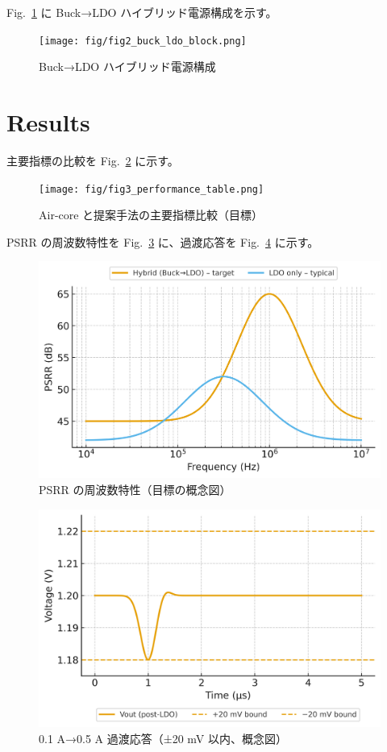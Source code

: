 \documentclass[conference]{IEEEtran}
\begin{document}
Fig.~\ref{fig2} に Buck→LDO ハイブリッド電源構成を示す。

\begin{figure}[htbp]
\centering
\texttt{[image: fig/fig2\_buck\_ldo\_block.png]}
\caption{Buck→LDO ハイブリッド電源構成}
\label{fig2}
\end{figure}

\section{Results}
主要指標の比較を Fig.~\ref{fig3} に示す。

\begin{figure}[htbp]
\centering
\texttt{[image: fig/fig3\_performance\_table.png]}
\caption{Air-core と提案手法の主要指標比較（目標）}
\label{fig3}
\end{figure}

PSRR の周波数特性を Fig.~\ref{fig4} に、過渡応答を Fig.~\ref{fig5} に示す。

\begin{figure}[htbp]
\centering
\includegraphics[width=0.8\linewidth]{fig/fig4_psrr_target.png}
\caption{PSRR の周波数特性（目標の概念図）}
\label{fig4}
\end{figure}

\begin{figure}[htbp]
\centering
\includegraphics[width=0.8\linewidth]{fig/fig5_transient_response.png}
\caption{0.1 A→0.5 A 過渡応答（±20 mV 以内、概念図）}
\label{fig5}
\end{figure}
\end{document}
